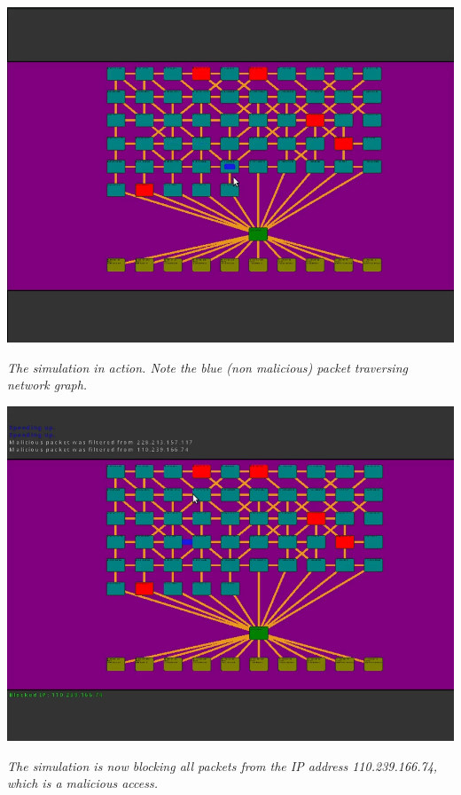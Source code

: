\documentclass[12pt]{article}
\begin{document}
\begin{flushleft}
\begin{multicols}{2}
\includegraphics[scale=0.20]{screenshot2.png}

\textit{The simulation in action. Note the blue (non malicious) packet traversing network graph.}

\includegraphics[scale=0.20]{screenshot3.png}

\textit{The simulation is now blocking all packets from the IP address 110.239.166.74, which is a malicious access.}


\end{multicols}
\end{flushleft}
\end{document}
